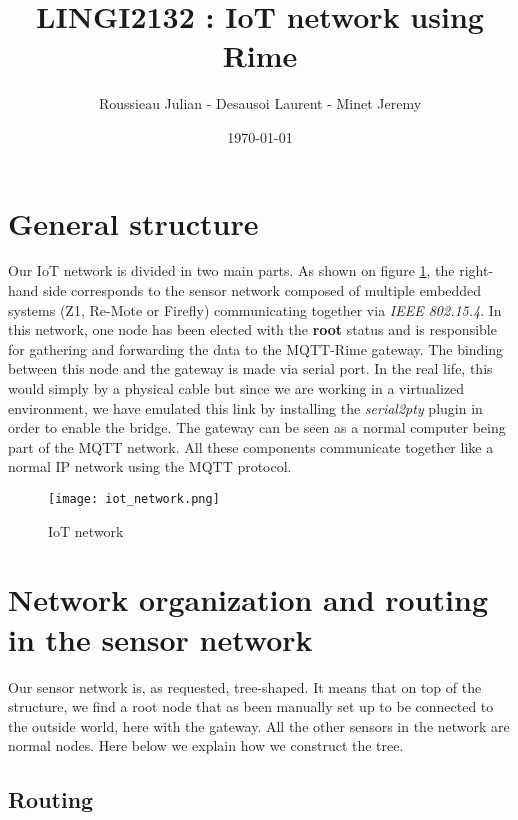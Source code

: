 \documentclass{article}
\title{LINGI2132 : IoT network using Rime}
\author{Roussieau Julian - Desausoi Laurent - Minet Jeremy}
\date{\today}
\begin{document}
\maketitle

\section{General structure}

Our IoT network is divided in two main parts. As shown on figure \ref{network}, the right-hand side corresponds to the sensor network composed of multiple embedded systems (Z1, Re-Mote or Firefly) communicating together via \textit{IEEE 802.15.4}. In this network, one node has been elected with the \textbf{root} status and is responsible for gathering and forwarding the data to the MQTT-Rime gateway. The binding between this node and the gateway is made via serial port. In the real life, this would simply by a physical cable but since we are working in a virtualized environment, we have emulated this link by installing the \textit{serial2pty} plugin in order to enable the bridge. The gateway can be seen as a normal computer being part of the MQTT network. All these components communicate together like a normal IP network using the MQTT protocol. 

\begin{figure}[!h]
   \texttt{[image: iot\_network.png]}
   \caption{\label{network} IoT network}
\end{figure}

\section{Network organization and routing in the sensor network}

Our sensor network is, as requested, tree-shaped. It means that on top of the structure, we find a root node that as been manually set up to be connected to the outside world, here with the gateway. All the other sensors in the network are normal nodes. Here below we explain how we construct the tree.

\subsection{Routing}
\end{document}
